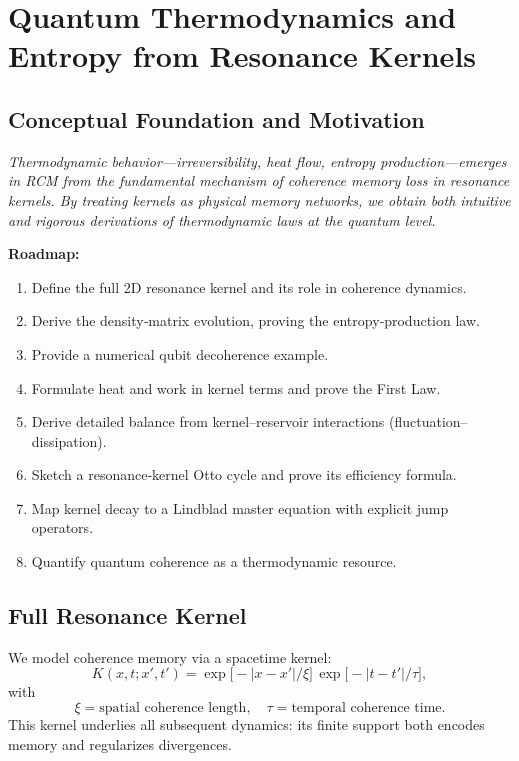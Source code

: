 \section{Quantum Thermodynamics and Entropy from Resonance Kernels}

\subsection{Conceptual Foundation and Motivation}

\textit{Thermodynamic behavior—irreversibility, heat flow, entropy production—emerges in RCM from the fundamental mechanism of coherence memory loss in resonance kernels.  By treating kernels as physical memory networks, we obtain both intuitive and rigorous derivations of thermodynamic laws at the quantum level.}

\vspace{0.5em}
\noindent\textbf{Roadmap:}  
\begin{enumerate}
  \item Define the full 2D resonance kernel and its role in coherence dynamics.
  \item Derive the density‐matrix evolution, proving the entropy‐production law.
  \item Provide a numerical qubit decoherence example.
  \item Formulate heat and work in kernel terms and prove the First Law.
  \item Derive detailed balance from kernel–reservoir interactions (fluctuation–dissipation).
  \item Sketch a resonance‐kernel Otto cycle and prove its efficiency formula.
  \item Map kernel decay to a Lindblad master equation with explicit jump operators.
  \item Quantify quantum coherence as a thermodynamic resource.
\end{enumerate}

\subsection{Full Resonance Kernel}

We model coherence memory via a spacetime kernel:
\begin{equation}\label{eq:full_kernel}
K(x,t;x',t')
= \exp\bigl[-|x - x'|/\xi\bigr]\,
  \exp\bigl[-|t - t'|/\tau\bigr],
\end{equation}
with
\[
\xi = \text{spatial coherence length},\quad
\tau = \text{temporal coherence time}.
\]
This kernel underlies all subsequent dynamics: its finite support both encodes memory and regularizes divergences.

